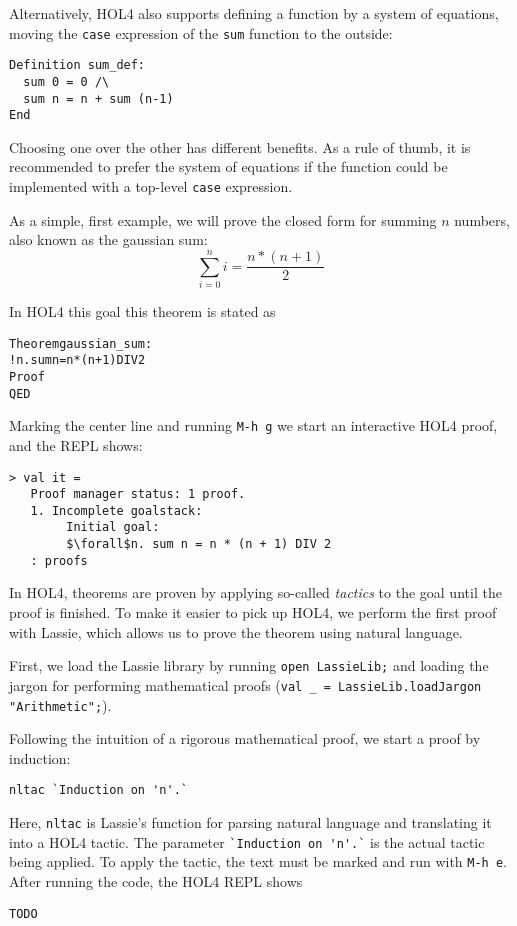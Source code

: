 \documentclass[10pt]{scrartcl}
\newcommand{\ekey}[1]{\texttt{#1}}
\begin{document}
Alternatively, HOL4 also supports defining a function by a system of equations,
moving the \texttt{case} expression of the \verb!sum! function to the outside:
\begin{lstlisting}
Definition sum_def:
  sum 0 = 0 /\
  sum n = n + sum (n-1)
End
\end{lstlisting}

Choosing one over the other has different benefits.
As a rule of thumb, it is recommended to prefer the system of equations if
the function could be implemented with a top-level \texttt{case} expression.

As a simple, first example, we will prove the closed form for summing $n$ numbers, also known as the gaussian sum:
\[
  \sum_{i=0}^{n} i = \frac{n * (n + 1)}{2}
\]

In HOL4 this goal this theorem is stated as
\begin{alltt}
Theorem gaussian_sum:
  ! n. sum n = n * (n + 1) DIV 2
Proof
QED
\end{alltt}

Marking the center line and running \ekey{M-h g}
we start an interactive HOL4 proof, and the REPL shows:

\begin{lstlisting}[mathescape=true]
> val it =
   Proof manager status: 1 proof.
   1. Incomplete goalstack:
        Initial goal:
        $\forall$n. sum n = n * (n + 1) DIV 2
   : proofs
\end{lstlisting}

In HOL4, theorems are proven by applying so-called \emph{tactics} to the goal
until the proof is finished.
To make it easier to pick up HOL4, we perform the first proof with Lassie, which
allows us to prove the theorem using natural language.

First, we load the Lassie library by running \lstinline{open LassieLib;} and
loading the jargon for performing mathematical proofs
(\lstinline{val _ = LassieLib.loadJargon "Arithmetic";}).

Following the intuition of a rigorous mathematical proof, we start a proof by
induction:
\begin{lstlisting}
nltac `Induction on 'n'.`
\end{lstlisting}

Here, \lstinline{nltac} is Lassie's function for parsing natural language and translating it into a HOL4 tactic.
The parameter \lstinline{`Induction on 'n'.`} is the actual tactic being applied.
To apply the tactic, the text must be marked and run with \ekey{M-h e}.
After running the code, the HOL4 REPL shows
\begin{lstlisting}
TODO
\end{lstlisting}
\end{document}
